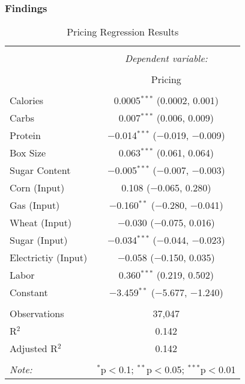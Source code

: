 \documentclass{beamer}
\begin{document}
\begin{frame}
\frametitle{Findings}
\begin{table}[!htbp]\tiny \centering
\caption{Pricing Regression Results}
  \label{} 
\begin{tabular}{@{\extracolsep{1pt}}lc} 
\\[-1.8ex]\hline 
\hline \\[-1.8ex] 
 & \multicolumn{1}{c}{\textit{Dependent variable:}} \\ 
\cline{2-2} 
\\[-1.8ex] & Pricing \\ 
\hline \\[-1.8ex] 
 Calories & 0.0005$^{***}$ (0.0002, 0.001) \\ 
  Carbs & 0.007$^{***}$ (0.006, 0.009) \\ 
  Protein & $-$0.014$^{***}$ ($-$0.019, $-$0.009) \\ 
  Box Size & 0.063$^{***}$ (0.061, 0.064) \\ 
  Sugar Content & $-$0.005$^{***}$ ($-$0.007, $-$0.003) \\ 
  Corn (Input) & 0.108 ($-$0.065, 0.280) \\ 
  Gas (Input) & $-$0.160$^{**}$ ($-$0.280, $-$0.041) \\ 
  Wheat (Input) & $-$0.030 ($-$0.075, 0.016) \\ 
  Sugar (Input) & $-$0.034$^{***}$ ($-$0.044, $-$0.023) \\ 
  Electrictiy (Input) & $-$0.058 ($-$0.150, 0.035) \\ 
  Labor & 0.360$^{***}$ (0.219, 0.502) \\ 
  Constant & $-$3.459$^{**}$ ($-$5.677, $-$1.240) \\ 
 \hline \\[-1.8ex] 
Observations & 37,047 \\ 
R$^{2}$ & 0.142 \\ 
Adjusted R$^{2}$ & 0.142 \\ 
\hline 
\hline \\[-1.8ex] 
\textit{Note:}  & \multicolumn{1}{r}{$^{*}$p$<$0.1; $^{**}$p$<$0.05; $^{***}$p$<$0.01} \\ 
\end{tabular}
\end{table} 

\end{frame}
\end{document}
